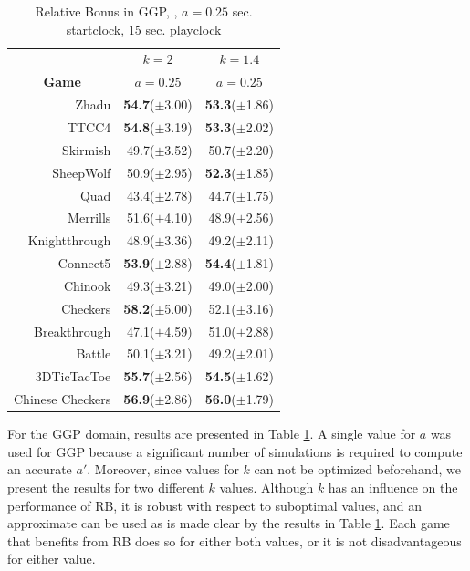 \documentclass{ecai2014}
\begin{document}
\begin{table}
{\caption{Relative Bonus in GGP, {}, $a = 0.25$  sec. startclock, 15 sec. playclock} \label{tab:rb_ggp}}
\begin{center}
\begin{tabular}{rrr}
\hline
& \multicolumn{1}{c}{\textbf{$k = 2$}} & \multicolumn{1}{c}{\textbf{$k = 1.4$}} \\
\cline{1-3}
\multicolumn{1}{c|}{\rule{0pt}{12pt}\textbf{Game}} & \multicolumn{1}{c}{\textbf{$a = 0.25$}} & \multicolumn{1}{c}{\textbf{$a = 0.25$}} \\ \hline
\multicolumn{1}{r|}{Zhadu} 				&{\bf{54.7}}($\pm$3.00)	& {\bf{53.3}}($\pm$1.86) \\
\multicolumn{1}{r|}{TTCC4} 				&{\bf{54.8}}($\pm$3.19)	& {\bf{53.3}}($\pm$2.02) \\
\multicolumn{1}{r|}{Skirmish} 			&49.7($\pm$3.52)		& 50.7($\pm$2.20) \\
\multicolumn{1}{r|}{SheepWolf} 			&50.9($\pm$2.95)		& {\bf{52.3}}($\pm$1.85) \\
\multicolumn{1}{r|}{Quad} 				&43.4($\pm$2.78)		& 44.7($\pm$1.75) \\
\multicolumn{1}{r|}{Merrills} 			&51.6($\pm$4.10)		& 48.9($\pm$2.56) \\
\multicolumn{1}{r|}{Knightthrough}		&48.9($\pm$3.36)		& 49.2($\pm$2.11) \\
\multicolumn{1}{r|}{Connect5} 			&{\bf{53.9}}($\pm$2.88)	& {\bf{54.4}}($\pm$1.81) \\
\multicolumn{1}{r|}{Chinook} 			&49.3($\pm$3.21)		& 49.0($\pm$2.00) \\
\multicolumn{1}{r|}{Checkers} 			&{\bf{58.2}}($\pm$5.00)	& 52.1($\pm$3.16) \\
\multicolumn{1}{r|}{Breakthrough}		&47.1($\pm$4.59)		& 51.0($\pm$2.88) \\
\multicolumn{1}{r|}{Battle}				&50.1($\pm$3.21)		& 49.2($\pm$2.01) \\
\multicolumn{1}{r|}{3DTicTacToe}		&{\bf{55.7}}($\pm$2.56)	& {\bf{54.5}}($\pm$1.62) \\
\multicolumn{1}{r|}{Chinese Checkers}	&{\bf{56.9}}($\pm$2.86)	& {\bf{56.0}}($\pm$1.79) \\
\hline
\end{tabular}
\end{center}
\end{table}
For the GGP domain, results are presented in Table \ref{tab:rb_ggp}. A single value for $a$ was used for GGP because a significant number of simulations is required to compute an accurate $a'$. Moreover, since values for $k$ can not be optimized beforehand, we present the results for two different $k$ values. Although $k$ has an influence on the performance of RB, it is robust with respect to suboptimal values, and an approximate can be used as is made clear by the results in Table \ref{tab:rb_ggp}. Each game that benefits from RB does so for either both values, or it is not disadvantageous for either value.
\end{document}
